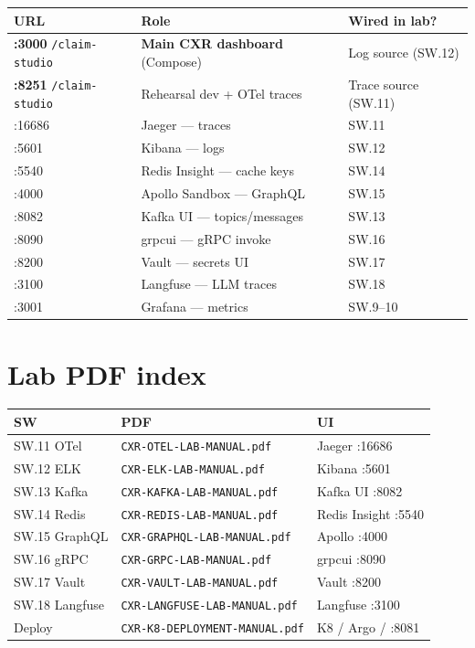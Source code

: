 \documentclass[11pt,a4paper]{report}
\begin{document}
\begin{center}
\begin{tabular}{lll}
\toprule
URL & Role & Wired in lab? \\
\midrule
\textbf{:3000} \texttt{/claim-studio} & \textbf{Main CXR dashboard} (Compose) & Log source (SW.12) \\
\textbf{:8251} \texttt{/claim-studio} & Rehearsal dev + OTel traces & Trace source (SW.11) \\
:16686 & Jaeger --- traces & SW.11 \\
:5601 & Kibana --- logs & SW.12 \\
:5540 & Redis Insight --- cache keys & SW.14 \\
:4000 & Apollo Sandbox --- GraphQL & SW.15 \\
:8082 & Kafka UI --- topics/messages & SW.13 \\
:8090 & grpcui --- gRPC invoke & SW.16 \\
:8200 & Vault --- secrets UI & SW.17 \\
:3100 & Langfuse --- LLM traces & SW.18 \\
:3001 & Grafana --- metrics & SW.9--10 \\
\bottomrule
\end{tabular}
\end{center}

\chapter{Lab PDF index}

\begin{center}
\begin{tabular}{lll}
\toprule
SW & PDF & UI \\
\midrule
SW.11 OTel & \texttt{CXR-OTEL-LAB-MANUAL.pdf} & Jaeger :16686 \\
SW.12 ELK & \texttt{CXR-ELK-LAB-MANUAL.pdf} & Kibana :5601 \\
SW.13 Kafka & \texttt{CXR-KAFKA-LAB-MANUAL.pdf} & Kafka UI :8082 \\
SW.14 Redis & \texttt{CXR-REDIS-LAB-MANUAL.pdf} & Redis Insight :5540 \\
SW.15 GraphQL & \texttt{CXR-GRAPHQL-LAB-MANUAL.pdf} & Apollo :4000 \\
SW.16 gRPC & \texttt{CXR-GRPC-LAB-MANUAL.pdf} & grpcui :8090 \\
SW.17 Vault & \texttt{CXR-VAULT-LAB-MANUAL.pdf} & Vault :8200 \\
SW.18 Langfuse & \texttt{CXR-LANGFUSE-LAB-MANUAL.pdf} & Langfuse :3100 \\
Deploy & \texttt{CXR-K8-DEPLOYMENT-MANUAL.pdf} & K8 / Argo / :8081 \\
\bottomrule
\end{tabular}
\end{center}
\end{document}

